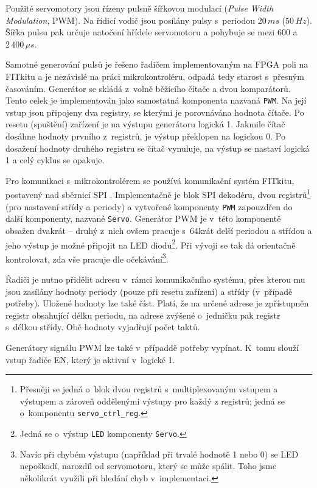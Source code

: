 Použité servomotory jsou řízeny pulsně šířkovou modulací (\emph{Pulse Width
Modulation}, PWM). Na řídicí vodič jsou posílány pulsy s~periodou $20\,ms$
($50\,Hz$). Šířka pulsu pak určuje natočení hřídele servomotoru a pohybuje se
mezi $600$ a $2\,400\,\mu{}s$. \cite{modelarska_stranka_dohledam_doma}

Samotné generování pulsů je řešeno řadičem implementovaným na FPGA poli na
FITkitu a je nezávislé na práci mikrokontroléru, odpadá tedy starost s~přesným
časováním. Generátor se skládá z~volně běžícího čítače a dvou komparátorů. Tento
celek je implementován jako samostatná komponenta nazvaná \texttt{PWM}. Na její
vstup jsou připojeny dva registry, se kterými je porovnávána hodnota čítače. Po
resetu (spuštění) zařízení je na výstupu generátoru logická 1. Jakmile čítač
dosáhne hodnoty prvního z~registrů, je výstup překlopen na logickou 0. Po
dosažení hodnoty druhého registru se čítač vynuluje, na výstup se nastaví
logická 1 a celý cyklus se opakuje.

Pro komunikaci s~mikrokontrolérem se používá komunikační systém FITkitu,
postavený nad sběrnicí SPI \cite{fitkit_communication}. Implementačně je blok SPI
dekodéru, dvou registrů\footnote{Přesněji se jedná o~blok dvou registrů
s~multiplexovaným vstupem a výstupem a zároveň oddělenými výstupy pro každý z
registrů; jedná se o~komponentu \texttt{servo\_ctrl\_reg}.} (pro nastavení střídy
a periody) a vytvořené komponenty \texttt{PWM} zapouzdřen do další komponenty,
nazvané \texttt{Servo}. Generátor PWM je v~této komponentě obsažen dvakrát --
druhý z~nich ovšem pracuje s~64krát delší periodou a střídou a jeho
výstup je možné připojit na LED diodu\footnote{Jedná se o~výstup \texttt{LED}
komponenty \texttt{Servo}.}. Při vývoji se tak dá orientačně kontrolovat, zda
vše pracuje dle očekávání\footnote{Navíc při chybém výstupu (například při
trvalé hodnotě 1 nebo 0) se LED nepoškodí, narozdíl od servomotoru, který se
může spálit. Toho jsme několikrát využili při hledání chyb v~implementaci.}.

Řadiči je nutno přidělit adresu v~rámci komunikačního systému, přes kterou mu
jsou zasílány hodnoty periody (pouze při resetu zařízení) a střídy (v~případě
potřeby). Uložené hodnoty lze také číst. Platí, že na určené adrese je
zpřístupněn registr obsahující délku periodu, na adrese zvýšené o~jedničku pak
registr s~délkou střídy. Obě hodnoty vyjadřují počet taktů.

Generátory signálu PWM lze také v~případdě potřeby vypínat. K~tomu slouží vstup
řadiče EN, který je aktivní v~logické 1.

